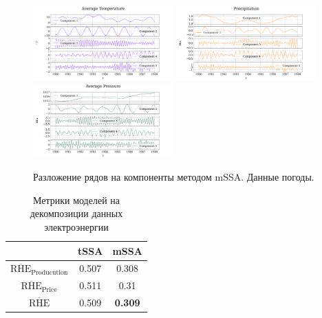 	\begin{figure}[h!]
		\centering
		\includegraphics[width=0.48\textwidth, keepaspectratio]{../../experiments/weather/mssa/figs/decomposition/manual/grouping_1/Average_Temperature.png}
		\includegraphics[width=0.48\textwidth, keepaspectratio]{../../experiments/weather/mssa/figs/decomposition/manual/grouping_1/Precipitation.png}
		\includegraphics[width=0.48\textwidth, keepaspectratio]{../../experiments/weather/mssa/figs/decomposition/manual/grouping_1/Average_Pressure.png}
		\caption{Разложение рядов на компоненты методом mSSA. Данные погоды.}\label{fig:weather_decomp_mssa}
	\end{figure}
	
	\def\arraystretch{1.2}
	\begin{table}[h!]
		\centering
		\caption{Метрики моделей на декомпозиции данных электроэнергии}\label{tab:decomp_electr_results}
		\begin{tabular}{|c|c|c|}
			\hline
			& tSSA  & mSSA           \\ \hline
			$ \overline{\text{RHE}}_{\text{Producution}} $  & 0.507 & 0.308          \\ \hline
			$ \overline{\text{RHE}}_{\text{Price}} $      & 0.511 & 0.31           \\ \hline
			$ \overline{\text{RHE}} $             & 0.509 & \textbf{0.309} \\ \hline
		\end{tabular}
	\end{table}
	
